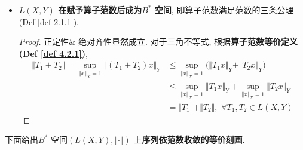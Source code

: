 \begin{defn}
\begin{rmk}
\begin{itemize}
				\vspace*{1em}
				
				\begin{proof}
					利用\textbf{算子范数的等价定义}, 
					\[ \Vert ST \Vert = \sup_{\Vert x \Vert_X = 1} \Vert S(T(x)) \Vert_Z 
					\leq \sup_{\Vert x \Vert_X = 1} \Vert S \Vert \cdot \Vert Tx \Vert_{Y} 
					\leq \sup_{\Vert x \Vert_X = 1} \Vert S \Vert \cdot \Vert T \Vert \cdot \Vert x \Vert_X 
					= \Vert S \Vert \cdot \Vert T \Vert \]
				\end{proof}
				
				\newpage
				
				\item \underline{\textbf{$L(X , Y)$ 在赋予算子范数后成为$B^*$ 空间}}, 即算子范数满足范数的三条公理 (Def \ref{def 2.1.1}). 
				
				\vspace*{1em}
				
				\begin{proof}
					正定性$\&$ 绝对齐性显然成立. 对于三角不等式, 根据\textbf{算子范数等价定义 (Def \ref{def 4.2.1})}, 
					\begin{align*}
						\Vert T_1 + T_2 \Vert 
						= \sup_{\Vert x \Vert_X = 1} \Vert (T_1 + T_2)x \Vert_Y 
						&\leq \sup_{\Vert x \Vert_X = 1} \Big( \Vert T_1 x \Vert_Y + \Vert T_2 x \Vert_Y \Big) \\
						&\leq \sup_{\Vert x \Vert_X = 1} \Vert T_1 x \Vert_Y + \sup_{\Vert x \Vert_X = 1} \Vert T_2 x \Vert_Y \\
						&= \Vert T_1 \Vert + \Vert T_2 \Vert , \,\, \forall T_1 , T_2 \in L(X , Y)
					\end{align*}
				\end{proof}
			\end{itemize}
		\end{rmk}
	\end{defn}
	
	\vspace*{2em}
	
	\hspace*{-1.95em}下面给出$B^*$ 空间$(L(X , Y),  \Vert \cdot \Vert)$ 上\textbf{序列依范数收敛的等价刻画}.
	
	\vspace*{2em}
	
